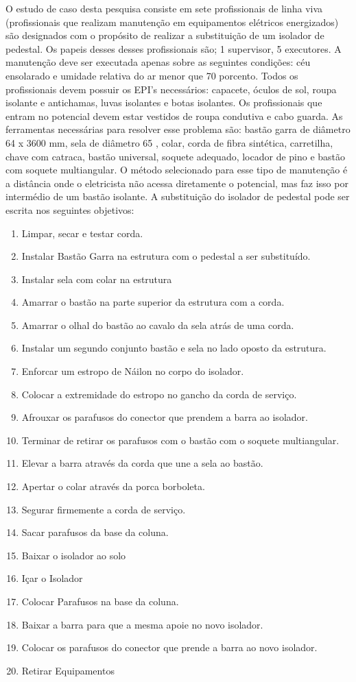 O estudo de caso desta pesquisa consiste em sete profissionais de linha viva (profissionais que realizam manutenção em equipamentos elétricos energizados) 
são designados com o propósito de realizar 
a substituição de um isolador de pedestal. Os papeis desses desses profissionais são; 1 supervisor, 5 executores. A manutenção deve ser executada apenas 
sobre as seguintes condições: céu ensolarado e umidade relativa do ar menor que 70 porcento. Todos os profissionais devem possuir os EPI's necessários: 
capacete, óculos de sol, roupa isolante e antichamas, luvas isolantes e botas isolantes. Os profissionais que entram no potencial devem estar vestidos de 
roupa condutiva e cabo guarda. As ferramentas necessárias para resolver esse problema são: bastão garra de diâmetro 64 x 3600 mm, sela de diâmetro 65 , 
colar, corda de fibra sintética, carretilha, chave com catraca, bastão universal, soquete adequado, locador de pino e bastão com soquete multiangular. O método selecionado 
para esse tipo de manutenção é a distância onde o eletricista não acessa diretamente o potencial, mas faz isso por intermédio de um bastão isolante. A substituição do isolador 
de pedestal pode ser escrita nos seguintes objetivos: 

\begin{enumerate}
	\item Limpar, secar e testar corda.
	\item Instalar Bastão Garra na estrutura com o pedestal a ser substituído.
	\item Instalar sela com colar na estrutura
	\item Amarrar o bastão na parte superior da estrutura com a corda.
	\item Amarrar o olhal do bastão ao cavalo da sela atrás de uma corda.
	\item Instalar um segundo conjunto bastão e sela no lado oposto da estrutura.
	\item Enforcar um estropo de Náilon no corpo do isolador.
	\item Colocar a extremidade do estropo no gancho da corda de serviço.
	\item Afrouxar os parafusos do conector que prendem a barra ao isolador.
	\item Terminar de retirar os parafusos com o bastão com o soquete multiangular.
	\item Elevar a barra através da corda que une a sela ao bastão.
	\item Apertar o colar através da porca borboleta.
	\item Segurar firmemente a corda de serviço.
	\item Sacar parafusos da base da coluna.
	\item Baixar o isolador ao solo
	\item Içar o Isolador
	\item Colocar Parafusos na base da coluna.
	\item Baixar a barra para que a mesma apoie no novo isolador.
	\item Colocar os parafusos do conector que prende a barra ao novo isolador. 
	\item Retirar Equipamentos
\end{enumerate}


